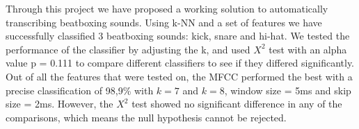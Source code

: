 Through this project we have proposed a working solution to automatically transcribing beatboxing sounds. Using k-NN and a set of features we have successfully classified 3 beatboxing sounds: kick, snare and hi-hat. We tested the performance of the classifier by adjusting the k, and used $X^2$ test with an alpha value p = 0.111 to compare different classifiers to see if they differed significantly. Out of all the features that were tested on, the MFCC performed the best with a precise classification of 98,9\% with $k = 7$ and $k = 8$, window size = 5ms and skip size = 2ms. However, the $X^2$ test showed no significant difference in any of the comparisons, which means the null hypothesis cannot be rejected. 